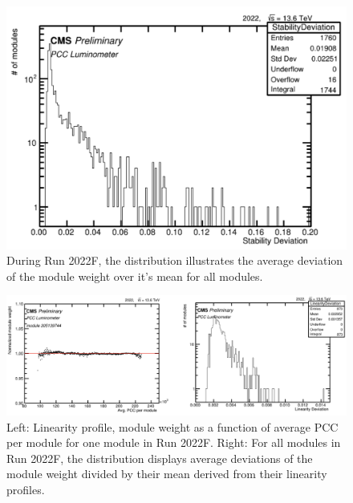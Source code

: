 
\begin{figure}[!htp]
  \centering
\includegraphics[width=1\textwidth]{ashish_thesis/stability_deviation_2022_1.png}
\caption[Module weight standard deviation]{%
  During Run 2022F, the distribution illustrates the average deviation of the module weight over it's mean for all modules.
}
\label{fig:stab_deviation_2022}
\end{figure}

\begin{figure}[!htp]
  \centering
\includegraphics[width=1\textwidth]{ashish_thesis/linearity_deviation_2022_1.png}
\caption[Module linearity & linearity deviation distribution]{%
 Left: Linearity profile, module weight as a function of average PCC per module for one module in Run 2022F. Right: For all modules in Run 2022F, the distribution displays average deviations of the module weight divided by their mean derived from their linearity profiles.
}
\label{fig:lin_deviation_2022}
\end{figure}


